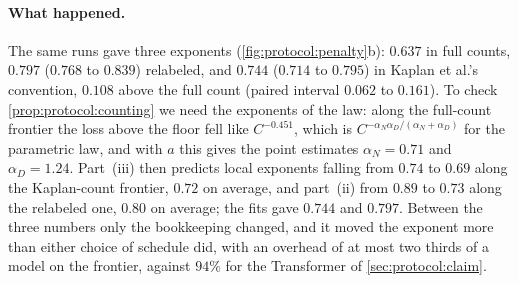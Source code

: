 \begin{refsection}
\paragraph{What happened.} The same runs gave three exponents (\cref{fig:protocol:penalty}b): $0.637$ in full counts, $0.797$ ($0.768$ to $0.839$) relabeled, and $0.744$ ($0.714$ to $0.795$) in Kaplan et al.'s convention, $0.108$ above the full count (paired interval $0.062$ to $0.161$). To check \cref{prop:protocol:counting} we need the exponents of the law: along the full-count frontier the loss above the floor fell like $C^{-0.451}$, which is $C^{-\alpha_N\alpha_D/(\alpha_N+\alpha_D)}$ for the parametric law, and with $a$ this gives the point estimates $\alpha_N=0.71$ and $\alpha_D=1.24$. Part~(iii) then predicts local exponents falling from $0.74$ to $0.69$ along the Kaplan-count frontier, $0.72$ on average, and part~(ii) from $0.89$ to $0.73$ along the relabeled one, $0.80$ on average; the fits gave $0.744$ and $0.797$. Between the three numbers only the bookkeeping changed, and it moved the exponent more than either choice of schedule did, with an overhead of at most two thirds of a model on the frontier, against $94\%$ for the Transformer of \cref{sec:protocol:claim}.


\end{refsection}

